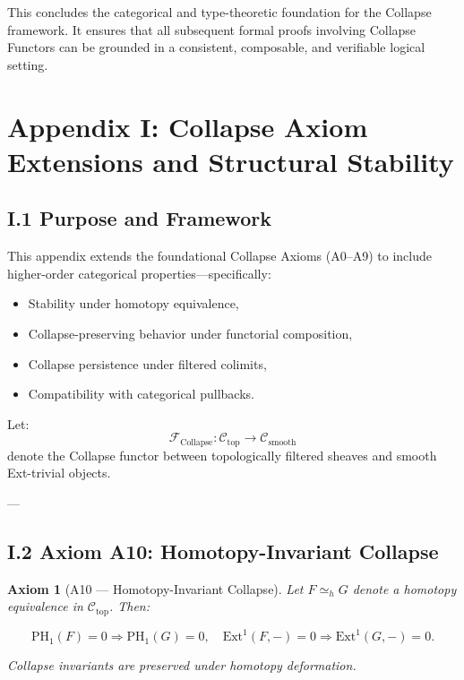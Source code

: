 \documentclass[11pt]{article}
\newtheorem{axiom}{Axiom}[section]
\begin{document}
\vspace{1em}
This concludes the categorical and type-theoretic foundation for the Collapse framework.  
It ensures that all subsequent formal proofs involving Collapse Functors can be grounded in a consistent, composable, and verifiable logical setting.




\section*{Appendix I: Collapse Axiom Extensions and Structural Stability}

\subsection*{I.1 Purpose and Framework}

This appendix extends the foundational Collapse Axioms (A0–A9) to include higher-order categorical properties—specifically:

\begin{itemize}
  \item Stability under homotopy equivalence,
  \item Collapse-preserving behavior under functorial composition,
  \item Collapse persistence under filtered colimits,
  \item Compatibility with categorical pullbacks.
\end{itemize}

Let:
\[
\mathcal{F}_{\mathrm{Collapse}} : \mathcal{C}_{\mathrm{top}} \to \mathcal{C}_{\mathrm{smooth}}
\]
denote the Collapse functor between topologically filtered sheaves and smooth Ext-trivial objects.

---

\subsection*{I.2 Axiom A10: Homotopy-Invariant Collapse}

\begin{axiom}[A10 — Homotopy-Invariant Collapse]
Let $F \simeq_h G$ denote a homotopy equivalence in $\mathcal{C}_{\mathrm{top}}$. Then:

\[
\mathrm{PH}_1(F) = 0 \Rightarrow \mathrm{PH}_1(G) = 0,
\quad \mathrm{Ext}^1(F, -) = 0 \Rightarrow \mathrm{Ext}^1(G, -) = 0.
\]

Collapse invariants are preserved under homotopy deformation.
\end{axiom}
\end{document}
